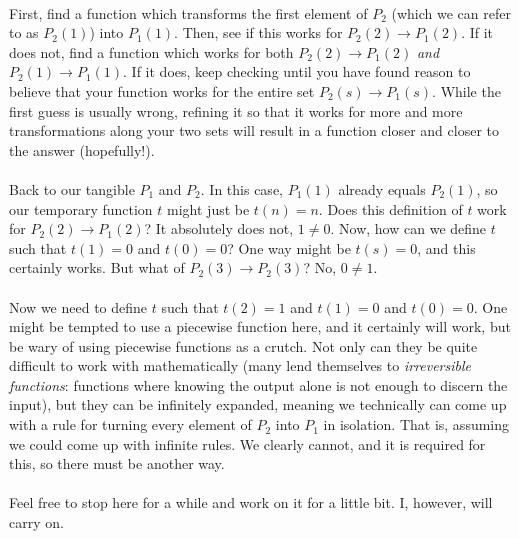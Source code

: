 \documentclass[12pt,letterpaper]{article}
\begin{document}
			\paragraph{} First, find a function which transforms the first element of $P_2$ (which we can refer to as $P_2(1)$) into $P_1(1)$. Then, see if this works for $P_2(2) \rightarrow P_1(2)$. If it does not, find a function which works for both $P_2(2) \rightarrow P_1(2)$ \textit{and} $P_2(1) \rightarrow P_1(1)$. If it does, keep checking until you have found reason to believe that your function works for the entire set $P_2(s) \rightarrow P_1(s)$. While the first guess is usually wrong, refining it so that it works for more and more transformations along your two sets will result in a function closer and closer to the answer (hopefully!).
			
			\paragraph{} Back to our tangible $P_1$ and $P_2$. In this case, $P_1(1)$ already equals $P_2(1)$, so our temporary function $t$ might just be $t(n) = n$. Does this definition of $t$ work for $P_2(2) \rightarrow P_1(2)$? It absolutely does not, $1 \neq 0$. Now, how can we define $t$ such that $t(1) = 0$ and $t(0) = 0$? One way might be $t(s) = 0$, and this certainly works. But what of $P_2(3) \rightarrow P_2(3)$? No, $0 \neq 1$.
			
			\paragraph{} Now we need to define $t$ such that $t(2) = 1$ and $t(1) = 0$ and $t(0) = 0$. One might be tempted to use a piecewise function here, and it certainly will work, but be wary of using piecewise functions as a crutch. Not only can they be quite difficult to work with mathematically (many lend themselves to \textit{irreversible functions}: functions where knowing the output alone is not enough to discern the input), but they can be infinitely expanded, meaning we technically can come up with a rule for turning every element of $P_2$ into $P_1$ in isolation. That is, assuming we could come up with infinite rules. We clearly cannot, and it is required for this, so there must be another way.
			
			\paragraph{} Feel free to stop here for a while and work on it for a little bit. I, however, will carry on.
			
\end{document}
